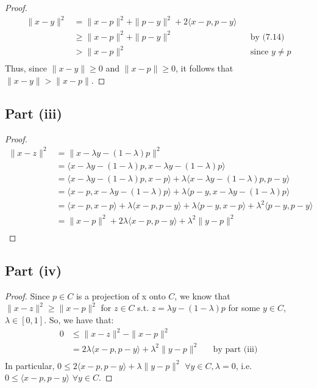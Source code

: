 \documentclass{article}
\begin{document}
\begin{proof}
\begin{align*}
\|x - y\|^2 &= \|x - p\|^2 + \|p - y\|^2 + 2 \langle x - p, p - y \rangle \\
&\geq \|x - p\|^2 + \|p - y\|^2 &&\text{by (7.14)} \\
&> \|x - p\|^2 &&\text{since $y \ne p$} \\
\end{align*}
Thus, since $\|x - y\| \geq 0$ and $\|x - p\| \geq 0$, it follows that $\|x - y\| > \|x - p\|$.
\end{proof}

\subsection*{Part (iii)}

\begin{proof}
\begin{align*}
\|x - z\|^2 &= \|x - \lambda y - (1 - \lambda)p\|^2 \\
&= \langle x - \lambda y - (1 - \lambda)p, x - \lambda y - (1 - \lambda)p \rangle \\
&= \langle x - \lambda y - (1 - \lambda)p, x - p\rangle + \lambda\langle x - \lambda y - (1 - \lambda)p, p - y \rangle \\
&=  \langle x - p, x - \lambda y - (1 - \lambda)p\rangle + \lambda\langle p - y, x - \lambda y - (1 - \lambda)p \rangle \\
&= \langle x - p, x - p\rangle + \lambda\langle x - p, p - y \rangle + \lambda\langle p - y, x - p\rangle + \lambda^2\langle p - y, p - y \rangle \\
&= \|x - p\|^2 + 2\lambda\langle x - p, p - y \rangle + \lambda^2\|y - p\|^2 \\
\end{align*}
\end{proof}

\subsection*{Part (iv)}

\begin{proof}
Since $p \in C$ is a projection of x onto $C$, we know that $\|x - z\|^2 \geq \|x - p\|^2$ for $z \in C$ s.t. $z = \lambda y - (1 - \lambda)p$ for some $y \in C$, $\lambda \in [0, 1]$. So, we have that:
\begin{align*}
0 &\leq \|x - z\|^2 - \|x - p\|^2 \\
&= 2\lambda\langle x - p, p - y \rangle + \lambda^2\|y - p\|^2 &&\text{by part (iii)} \\
\end{align*} 
In particular, $0 \leq 2\langle x - p, p - y \rangle + \lambda\|y - p\|^2$ $\forall y \in C, \lambda =0$, i.e. $0 \leq \langle x - p, p - y \rangle$ $\forall y \in C$.
\end{proof}
\end{document}
